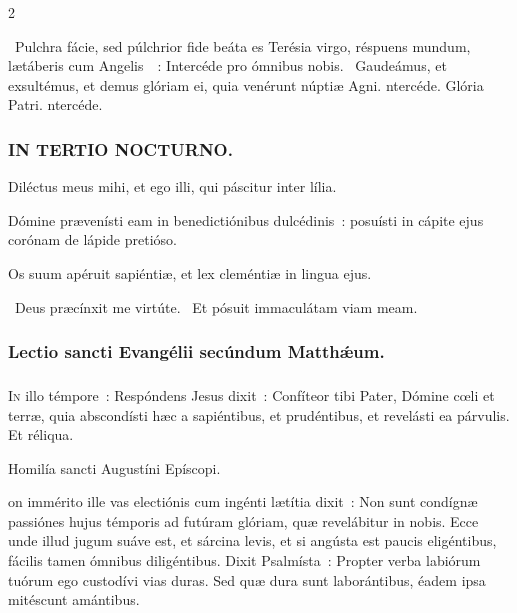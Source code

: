 \documentclass[9pt,twoside]{extarticle}
\begin{document}
\begin{multicols}{2}
{{\begin{tightlist}{}
\item {}~Pulchra fácie, sed púlchrior fide beáta es Terésia virgo, réspuens mundum, lætáberis cum Angelis~~: \textred{*} Intercéde pro ómnibus nobis. ~Gaudeámus, et exsultémus, et demus glóriam ei, quia venérunt núptiæ Agni. ntercéde. Glória Patri. ntercéde.
\end{tightlist}

\subsubsection*{\center \textsc{IN TERTIO NOCTURNO.}}
\begin{tightlist}{}
\item {} Diléctus meus mihi, et ego illi, qui páscitur inter lília.
\item {} Dómine prævenísti eam in benedictiónibus dulcédinis~: posuísti in cápite ejus corónam de lápide pretióso.
\item {} Os suum apéruit sapiéntiæ, et lex cleméntiæ in lingua ejus.
\item {}~Deus præcínxit me virtúte. ~Et pósuit immaculátam viam meam.
\end{tightlist}

\subsubsection*{\center Lectio sancti Evangélii secúndum Matthǽum.}
\subsubsection*{\center {}}
\lettrine{I}n illo témpore~: Respóndens Jesus dixit~: Confíteor tibi Pater, Dómine cœli et terræ, quia abscondísti hæc a sapiéntibus, et prudéntibus, et revelásti ea párvulis. Et réliqua.

\begin{center}Homilía sancti Augustíni Epíscopi.\\
\end{center}
on immérito ille vas electiónis cum ingénti lætítia dixit~: Non sunt condígnæ passiónes hujus témporis ad futúram glóriam, quæ revelábitur in nobis. Ecce unde illud jugum suáve est, et sárcina levis, et si angústa est paucis eligéntibus, fácilis tamen ómnibus diligéntibus. Dixit Psalmísta~: Propter verba labiórum tuórum ego custodívi vias duras. Sed quæ dura sunt laborántibus, éadem ipsa mitéscunt amántibus.

}}
\end{multicols}
\end{document}
